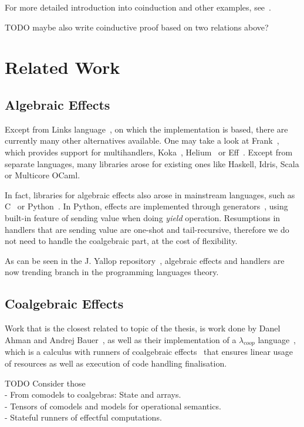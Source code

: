 \documentclass[declaration,shortabstract]{iithesis}
\theoremstyle{definition} \newtheorem{definition}{Definition}[chapter]
\theoremstyle{remark} \newtheorem{remark}[definition]{Observation}
\theoremstyle{plain} \newtheorem{theorem}[definition]{Theorem}
\theoremstyle{plain} \newtheorem{lemma}[definition]{Lemma}
\begin{document}
    \noindent
    For more detailed introduction into coinduction and other examples,
    see~\cite{jacobs-rutten, sangiorgi-intro}.

    \noindent
    TODO maybe also write coinductive proof based on two relations above?

\section{Related Work}
    \subsection{Algebraic Effects}

    Except from Links language~\cite{handlers-cps}, on which the implementation
    is based, there are currently many other alternatives available. One may take
    a look at Frank~\cite{frank}, which provides support for multihandlers,
    Koka~\cite{leijen-koka}, Helium~\cite{helium} or Eff~\cite{eff}. Except from
    separate languages, many libraries arose for existing ones like Haskell,
    Idris, Scala or Multicore OCaml.

    In fact, libraries for algebraic effects also arose in mainstream languages,
    such as C~\cite{leijen-c} or Python~\cite{python-effect}. In Python,
    effects are implemented through generators~\cite{one-shot}, using built-in
    feature of sending value when doing \textit{yield} operation. Resumptions in
    handlers that are sending value are one-shot and tail-recursive, therefore
    we do not need to handle the coalgebraic part, at the cost of flexibility.

    As can be seen in the J. Yallop repository~\cite{effects-bibliography}, algebraic
    effects and handlers are now trending branch in the programming languages theory.

    \subsection{Coalgebraic Effects}

    Work that is the closest related to topic of the thesis, is work done by
    Danel Ahman and Andrej Bauer~\cite{runners-in-action}, as well as their
    implementation of a $\lambda_{coop}$ language~\cite{coop}, which is a
    calculus with runners of coalgebraic effects~\cite{runners-uustalu}
    that ensures linear usage of resources as well as execution of
    code handling finalisation.

\noindent
TODO Consider those\\
- From comodels to coalgebras: State and arrays.\\
- Tensors of comodels and models for operational semantics.\\
- Stateful runners of effectful computations.
\end{document}
